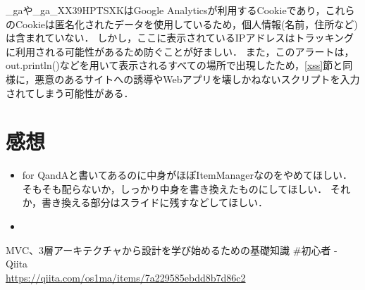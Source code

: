 \documentclass[titlepage,a4paper]{jsarticle}
\begin{document}
\_gaや\_ga\_XX39HPTSXKはGoogle Analyticsが利用するCookieであり，これらのCookieは匿名化されたデータを使用しているため，個人情報(名前，住所など)は含まれていない．
しかし，ここに表示されているIPアドレスはトラッキングに利用される可能性があるため防ぐことが好ましい．
また，このアラートは，out.println()などを用いて表示されるすべての場所で出現したため，\ref{xss}節と同様に，悪意のあるサイトへの誘導やWebアプリを壊しかねないスクリプトを入力されてしまう可能性がある．
\section{感想}
\begin{itemize}
  \item for QandAと書いてあるのに中身がほぼItemManagerなのをやめてほしい．
        そもそも配らないか，しっかり中身を書き換えたものにしてほしい．
        それか，書き換える部分はスライドに残すなどしてほしい．
  \item
\end{itemize}

\begin{thebibliography}{99}
  MVC、3層アーキテクチャから設計を学び始めるための基礎知識 \#初心者 - Qiita\\\url{https://qiita.com/os1ma/items/7a229585ebdd8b7d86c2}
\end{thebibliography}
\end{document}
